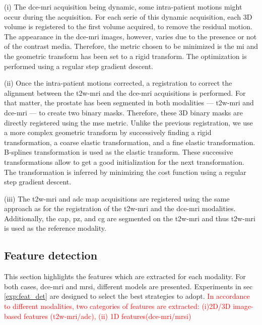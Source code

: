 \documentclass[final,3p,times,twocolumn]{elsarticle}
\begin{document}
(i) The \ac{dce}-\ac{mri} acquisition being dynamic, some intra-patient motions
might occur during the acquisition. For each serie of this dynamic
acquisition, each 3D volume is registered to the first volume acquired, to
remove the residual motion. The appearance in the \ac{dce}-\ac{mri} images,
however, varies due to the presence or not of the contrast media. Therefore,
the metric chosen to be minimized is the \ac{mi} and the geometric transform
has been set to a rigid transform. The optimization is performed using a
regular step gradient descent.

(ii) Once the intra-patient motions corrected, a registration to correct the
alignment between the \ac{t2w}-\ac{mri} and the \ac{dce}-\ac{mri} acquisitions
is performed. For that matter, the prostate has been segmented in both
modalities --- \ac{t2w}-\ac{mri} and \ac{dce}-\ac{mri} --- to create two binary
masks. Therefore, these 3D binary masks are directly registered using the
\ac{mse} metric. Unlike the previous registration, we use a more complex
geometric transform by successively finding a rigid transformation, a coarse
elastic transformation, and a fine elastic transformation. B-splines
transformation is used as the elastic transform. These successive
transformations allow to get a good initialization for the next transformation.
The transformation is inferred by minimizing the cost function using a regular
step gradient descent.

(iii) The \ac{t2w}-\ac{mri} and \ac{adc} map acquisitions are registered using
the same approach as for the registration of the \ac{t2w}-\ac{mri} and the
\ac{dce}-\ac{mri} modalities.  Additionally, the \ac{cap}, \ac{pz}, and \ac{cg}
are segmented on the \ac{t2w}-\ac{mri} and thus \ac{t2w}-\ac{mri} is used as
the reference modality.

\subsection{Feature detection}

This section highlights the features which are extracted for each modality. For
both cases, \ac{dce}-\ac{mri} and \ac{mrsi}, different models are
presented. Experiments in \acs{sec}\,\ref{exp:feat_det} are designed to select
the best strategies to adopt.
\textcolor{red}{In accordance to different modalities, two categories of
  features are extracted: (i)2D/3D image-based features
  (\acs*{t2w}-\ac{mri}/\acs*{adc}), (ii) 1D
  features(\acs*{dce}-\ac{mri}/\acs*{mrsi})}
\end{document}
